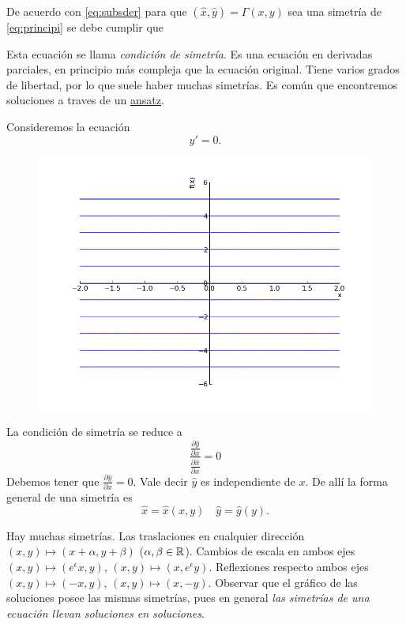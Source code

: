 De acuerdo con \eqref{eq:subsder} para que $(\hat{x},\hat{y})=\Gamma(x,y)$ sea una simetría de \eqref{eq:principi} se debe cumplir que

 Esta ecuación se llama \emph{condición de simetría}. Es una ecuación en derivadas parciales, en principio más compleja que la ecuación original. Tiene varios grados de libertad, por lo que suele haber muchas simetrías.  Es común que encontremos soluciones a  traves de un  \href{http://es.wikipedia.org/wiki/Ansatz}{ansatz}. 





 \begin{ejemplo}{} Consideremos la ecuación
   \begin{equation}\label{eq:trivial}y'=0.
    \end{equation}
    \begin{figure}
   \vspace{-.5cm}\includegraphics[scale=.3]{imagenes/sol_trivial.png}
 \end{figure}
La condición de simetría se reduce a 
\[
\frac{\frac{\partial\hat{y}}{\partial x}}{\frac{\partial\hat{x}}{\partial x}}=0
\]
Debemos tener que $\frac{\partial\hat{y}}{\partial x}=0$. Vale decir $\hat{y}$ es independiente de $x$. De allí la forma general de una simetría es 
\[\hat{x}=\hat{x}(x,y)\quad \hat{y}=\hat{y}(y).\]
\end{ejemplo}
 Hay muchas simetrías. Las traslaciones en cualquier dirección $(x,y)\mapsto (x+\alpha ,y+\beta)$ ($\alpha,\beta\in\mathbb{R}$). Cambios de escala en ambos ejes  $(x,y)\mapsto (e^{\epsilon}x,y)$, $(x,y)\mapsto (x,e^{\epsilon}y)$. Reflexiones respecto ambos ejes  $(x,y)\mapsto (-x,y)$, $(x,y)\mapsto (x,-y)$.  Observar que el gráfico de las soluciones posee las mismas simetrías, pues en general \emph{las simetrías de una ecuación llevan soluciones en soluciones}.

